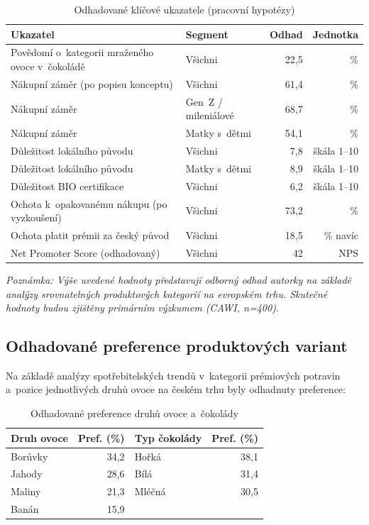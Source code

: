 \begin{table}[H]
\centering
\caption{Odhadované klíčové ukazatele (pracovní hypotézy)}
\label{tab:estimated_indicators}
\begin{tabularx}{\textwidth}{Xlrr}
\toprule
\textbf{Ukazatel} & \textbf{Segment} & \textbf{Odhad} & \textbf{Jednotka} \\
\midrule
Povědomí o~kategorii mraženého ovoce v~čokoládě & Všichni & 22,5 & \% \\
Nákupní záměr (po popisu konceptu) & Všichni & 61,4 & \% \\
Nákupní záměr & Gen~Z / mileniálové & 68,7 & \% \\
Nákupní záměr & Matky s~dětmi & 54,1 & \% \\
Důležitost lokálního původu & Všichni & 7,8 & škála 1--10 \\
Důležitost lokálního původu & Matky s~dětmi & 8,9 & škála 1--10 \\
Důležitost BIO certifikace & Všichni & 6,2 & škála 1--10 \\
Ochota k~opakovanému nákupu (po vyzkoušení) & Všichni & 73,2 & \% \\
Ochota platit prémii za český původ & Všichni & 18,5 & \% navíc \\
Net Promoter Score (odhadovaný) & Všichni & 42 & NPS \\
\bottomrule
\end{tabularx}
\end{table}

\textit{Poznámka: Výše uvedené hodnoty představují odborný odhad autorky na základě analýzy srovnatelných produktových kategorií na evropském trhu. Skutečné hodnoty budou zjištěny primárním výzkumem (CAWI, n=400).}

\subsection{Odhadované preference produktových variant}

Na základě analýzy spotřebitelských trendů v~kategorii prémiových potravin a~pozice jednotlivých druhů ovoce na českém trhu byly odhadnuty preference:

\begin{table}[H]
\centering
\caption{Odhadované preference druhů ovoce a~čokolády}
\label{tab:preferences}
\begin{tabular}{lr|lr}
\toprule
\textbf{Druh ovoce} & \textbf{Pref. (\%)} & \textbf{Typ čokolády} & \textbf{Pref. (\%)} \\
\midrule
Borůvky & 34,2 & Hořká & 38,1 \\
Jahody & 28,6 & Bílá & 31,4 \\
Maliny & 21,3 & Mléčná & 30,5 \\
Banán & 15,9 & & \\
\bottomrule
\end{tabular}
\end{table}

